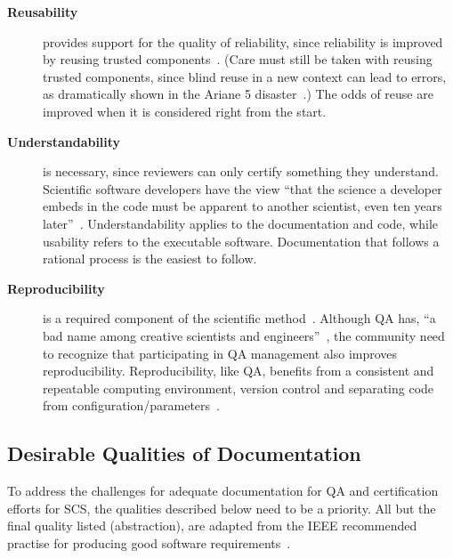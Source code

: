 \documentclass[12pt]{article}
\begin{document}
\begin{description}
\item [\textbf{Reusability}] provides support for the quality of reliability,
  since reliability is improved by reusing trusted components~\cite{Dubois2005}.
  (Care must still be taken with reusing trusted components, since blind reuse
  in a new context can lead to errors, as dramatically shown in the Ariane 5
  disaster~\cite[p.~37--38]{OliveiraAndStewart2006}.)  The odds of reuse are
  improved when it is considered right from the start.

\item [\textbf{Understandability}] is necessary, since reviewers can only certify
  something they understand.  Scientific software developers have the
  view ``that the science a developer embeds in the code must be apparent to
  another scientist, even ten years later''~\cite{Kelly2013}.
  Understandability applies to the documentation and code, while usability
  refers to the executable software.  Documentation that follows a rational
  process is the easiest to follow.

\item [\textbf{Reproducibility}] is a required component of the scientific
  method~\cite{Davison2012}.  Although QA has, ``a bad name among
  creative scientists and engineers''~\cite[p.~352]{Roache1998}, the community
  need to recognize that participating in QA management also improves
  reproducibility.  Reproducibility, like QA, benefits from a consistent and
  repeatable computing environment, version control and separating code from
  configuration/parameters~\cite{Davison2012}.
\end{description}

\subsection{Desirable Qualities of Documentation}

To address the challenges for adequate documentation for QA and certification
efforts for SCS, the qualities described below need to be a priority.  All but
the final quality listed (abstraction), are adapted from the IEEE recommended
practise for producing good software requirements~\cite{IEEE1998}.
\end{document}
